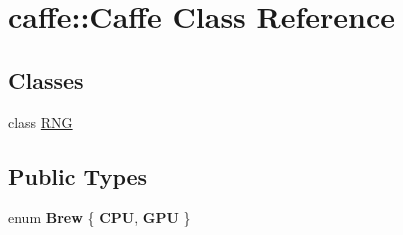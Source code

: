 \hypertarget{classcaffe_1_1Caffe}{}\section{caffe\+:\+:Caffe Class Reference}
\label{classcaffe_1_1Caffe}
\subsection*{Classes}
\begin{DoxyCompactItemize}
\item 
class \hyperlink{classcaffe_1_1Caffe_1_1RNG}{R\+NG}
\end{DoxyCompactItemize}
\subsection*{Public Types}
\begin{DoxyCompactItemize}
\item 
enum {\bfseries Brew} \{ {\bfseries C\+PU}, 
{\bfseries G\+PU}
 \}\hypertarget{classcaffe_1_1Caffe_af8f607248c1f212be1f6f1c988d80e4e}{}\label{classcaffe_1_1Caffe_af8f607248c1f212be1f6f1c988d80e4e}

\end{DoxyCompactItemize}
